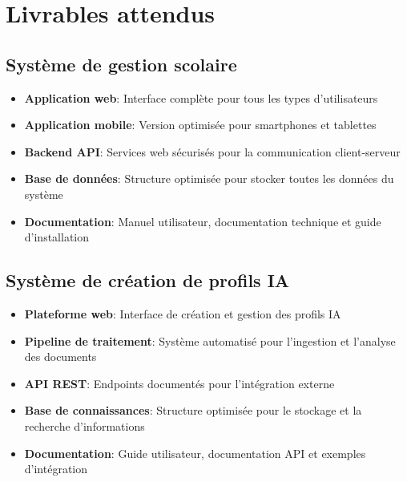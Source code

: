 \section{Livrables attendus}

\subsection{Système de gestion scolaire}

\begin{itemize}
  \item \textbf{Application web}: Interface complète pour tous les types d'utilisateurs
  
  \item \textbf{Application mobile}: Version optimisée pour smartphones et tablettes
  
  \item \textbf{Backend API}: Services web sécurisés pour la communication client-serveur
  
  \item \textbf{Base de données}: Structure optimisée pour stocker toutes les données du système
  
  \item \textbf{Documentation}: Manuel utilisateur, documentation technique et guide d'installation
\end{itemize}

\subsection{Système de création de profils IA}

\begin{itemize}
  \item \textbf{Plateforme web}: Interface de création et gestion des profils IA
  
  \item \textbf{Pipeline de traitement}: Système automatisé pour l'ingestion et l'analyse des documents
  
  \item \textbf{API REST}: Endpoints documentés pour l'intégration externe
  
  \item \textbf{Base de connaissances}: Structure optimisée pour le stockage et la recherche d'informations
  
  \item \textbf{Documentation}: Guide utilisateur, documentation API et exemples d'intégration
\end{itemize}


